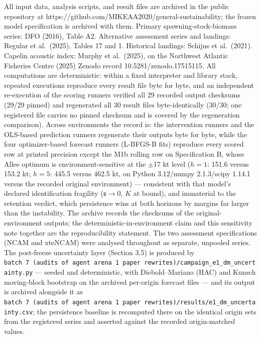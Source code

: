 \documentclass[11pt]{article}
\begin{document}
All input data, analysis scripts, and result files are archived in the
public repository at
https://github.com/MIKEAA2020/general-sustainability; the frozen model
specification is archived with them. Primary spawning-stock-biomass
series: DFO (2016), Table A2. Alternative assessment series and
landings: Regular et al.~(2025), Tables 17 and 1. Historical landings:
Schijns et al.~(2021). Capelin acoustic index: Murphy et al.~(2025), on
the Northwest Atlantic Fisheries Centre (2025) Zenodo record
10.5281/zenodo.17515115. All computations are deterministic: within a
fixed interpreter and library stack, repeated executions reproduce every
result file byte for byte, and an independent re-execution of the
scoring runners verified all 29 recorded output checksums (29/29 pinned)
and regenerated all 30 result files byte-identically (30/30; one
registered file carries no pinned checksum and is covered by the
regeneration comparison). Across environments the record is: the
intervention runners and the OLS-based prediction runners regenerate
their outputs byte for byte, while the four optimizer-based forecast
runners (L-BFGS-B fits) reproduce every scored row at printed precision
except the M1b rolling row on Specification B, whose Allee optimum is
environment-sensitive at the \ensuremath{\pm}17 kt level (\(h=1\): 151.6 versus 153.2
kt; \(h=5\): 445.5 versus 462.5 kt, on Python 3.12/numpy 2.1.3/scipy
1.14.1 versus the recorded original environment) --- consistent with
that model's declared identification fragility (\(\mathfrak s\to 0\),
\(K\) at bound), and immaterial to the retention verdict, which
persistence wins at both horizons by margins far larger than the
instability. The archive records the checksums of the
original-environment outputs; the deterministic-in-environment claim and
this sensitivity note together are the reproducibility statement. The
two assessment specifications (NCAM and xteNCAM) were analysed
throughout as separate, unpooled series. The post-freeze uncertainty
layer (Section 3.5) is produced by
\texttt{batch\ 7\ (audits\ of\ agent\ arena\ 1\ paper\ rewrites)/campaign\_e1\_dm\_uncertainty.py}
--- seeded and deterministic, with Diebold--Mariano (HAC) and Kunsch
moving-block bootstrap on the archived per-origin forecast files --- and
its output is archived alongside it as
\texttt{batch\ 7\ (audits\ of\ agent\ arena\ 1\ paper\ rewrites)/results/e1\_dm\_uncertainty.csv};
the persistence baseline is recomputed there on the identical origin
sets from the registered series and asserted against the recorded
origin-matched values.
\end{document}
